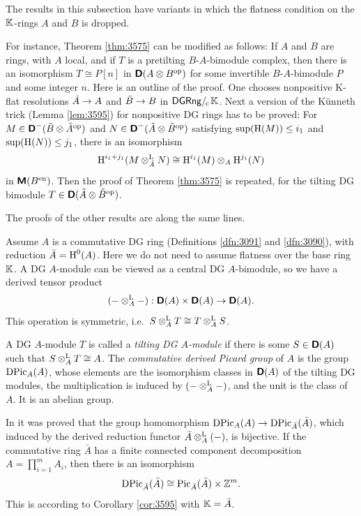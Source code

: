 \begin{rem} \label{rem:4800}
The results in this subsection have variants in which the flatness condition
on the $\mathbb{K}$-rings $A$ and $B$ is dropped. 

For instance, Theorem \ref{thm:3575} can be modified as follows: If $A$ and $B$ 
are rings, with $A$ local, and if $T$ is a pretilting $B$-$A$-bimodule complex, 
then there is an isomorphism 
$T \cong P[n]$ in $\boldsymbol{\mathsf{D}}(A \otimes B^{\mathrm{op}})$ 
for some invertible $B$-$A$-bimodule $P$ and some integer $n$. 
Here is an outline of the proof. One chooses nonpositive K-flat resolutions
$\tilde{A} \to A$ and $\tilde{B} \to B$
in $\mathrm{\mathsf{DGRng}} /_{\mspace{-2mu} \mathrm{c}} \mspace{2mu} \mathbb{K}$. 
Next a version of the K\"unneth trick (Lemma \ref{lem:3595}) for nonpositive DG 
rings has to be proved: For 
$M \in \boldsymbol{\mathsf{D}}^-(\tilde{B} \otimes \tilde{A}^{\mathrm{op}})$
and 
$N \in \boldsymbol{\mathsf{D}}^-(\tilde{A} \otimes \tilde{B}^{\mathrm{op}})$
satisfying 
$\operatorname{sup}(\operatorname{H}(M)) \leq i_1$ and $\operatorname{sup}(\operatorname{H}(N)) \leq j_1$,
there is an isomorphism
\[ \operatorname{H}^{i_1 + j_1}(M \otimes^{\mathrm{L}}_{\tilde{A}} N) \cong 
\operatorname{H}^{i_1}(M) \otimes_A \operatorname{H}^{j_1}(N)  \]
in $\boldsymbol{\mathsf{M}}(B^{\mathrm{en}})$. 
Then the proof of Theorem \ref{thm:3575} is 
repeated, for the tilting DG bimodule 
$T \in \boldsymbol{\mathsf{D}}(\tilde{A} \otimes \tilde{B}^{\mathrm{op}})$. 

The proofs of the other results are along the same lines. 
\end{rem}

\begin{rem} \label{rem:3590}
Assume $A$ is a commutative DG ring (Definitions \ref{dfn:3091} and 
\ref{dfn:3090}), with reduction $\bar{A} = \operatorname{H}^0(A)$. Here we do not need 
to assume flatness over the base ring $\mathbb{K}$. A DG $A$-module can 
be viewed as a central DG $A$-bimodule, so we have a derived tensor product 
\[ (- \otimes^{\mathrm{L}}_{A} -) : \boldsymbol{\mathsf{D}}(A) \times \boldsymbol{\mathsf{D}}(A) \to \boldsymbol{\mathsf{D}}(A) . 
\]
This operation is symmetric, i.e.\ 
$S \otimes^{\mathrm{L}}_{A} T \cong T \otimes^{\mathrm{L}}_{A} S$. 

A DG $A$-module $T$ is called a {\em
tilting DG $A$-module} if there is some $S \in \boldsymbol{\mathsf{D}}(A)$ such that 
$S \otimes^{\mathrm{L}}_{A} T \cong A$.
The {\em commutative derived Picard group} of $A$ is the group 
$\operatorname{DPic}_{A}(A)$, whose elements are the isomorphism classes in $\boldsymbol{\mathsf{D}}(A)$
of the tilting DG modules, the multiplication is induced by 
$(- \otimes^{\mathrm{L}}_{A} -)$, and the unit is the class of $A$. It is an abelian 
group. 

In \cite[Theorem 6.14]{Ye8} it was proved that the group homomorphism 
$\operatorname{DPic}_{A}(A) \to \operatorname{DPic}_{\bar{A}}(\bar{A})$,
which induced by the derived reduction functor 
$\bar{A} \otimes^{\mathrm{L}}_{A} (-)$,
is bijective. If the commutative ring $\bar{A}$
has a finite connected component decomposition 
$A = \prod_{i = 1}^m A_i$, then there is an isomorphism
\[ \operatorname{DPic}_{\bar{A}}(\bar{A}) \cong 
\operatorname{Pic}_{\bar{A}}(\bar{A}) \times \mathbb{Z}^m  . \]
This is according to Corollary \ref{cor:3595} with 
$\mathbb{K} = \bar{A}$. 
\end{rem}

